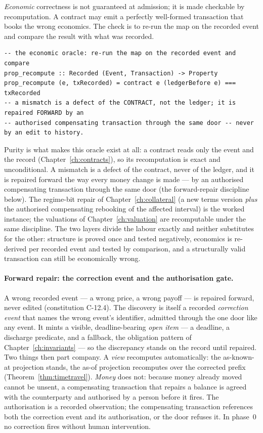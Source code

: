 \emph{Economic} correctness is not guaranteed at admission; it is made checkable by
recomputation. A contract may emit a perfectly well-formed transaction that books the wrong
economics. The check is to re-run the map on the recorded event and compare the result with
what was recorded.

\begin{lstlisting}
-- the economic oracle: re-run the map on the recorded event and compare
prop_recompute :: Recorded (Event, Transaction) -> Property
prop_recompute (e, txRecorded) = contract e (ledgerBefore e) === txRecorded
-- a mismatch is a defect of the CONTRACT, not the ledger; it is repaired FORWARD by an
-- authorised compensating transaction through the same door -- never by an edit to history.
\end{lstlisting}

Purity is what makes this oracle exist at all: a contract reads only the event and the
record (Chapter~\ref{ch:contracts}), so its recomputation is exact and unconditional. A
mismatch is a defect of the contract, never of the ledger, and it is repaired forward the way every
money change is made --- by an authorised compensating transaction through the same door
(the forward-repair discipline below). The regime-bit
repair of Chapter~\ref{ch:collateral} (a new terms version \emph{plus} the authorised compensating
rebooking of the affected interval) is the worked instance; the valuations of
Chapter~\ref{ch:valuation} are recomputable under the same discipline. The two layers
divide the labour exactly and neither substitutes for the other: structure is proved once
and tested negatively, economics is re-derived per recorded event and tested by comparison,
and a structurally valid transaction can still be economically wrong.

\paragraph{Forward repair: the correction event and the authorisation gate.}
A wrong recorded event --- a wrong price, a wrong payoff --- is repaired forward, never
edited (constitution C-12.4). The discovery is itself a recorded \emph{correction event}
that names the wrong event's identifier, admitted through the one door like any event. It
mints a visible, deadline-bearing \emph{open item} --- a deadline, a discharge predicate,
and a fallback, the obligation pattern of Chapter~\ref{ch:invariants} --- so the discrepancy
stands on the record until repaired. Two things then part company. A \emph{view} recomputes
automatically: the as-known-at projection stands, the as-of projection recomputes over the
corrected prefix (Theorem~\ref{thm:timetravel}). \emph{Money} does not: because money already
moved cannot be unsent, a compensating transaction that repairs a balance is agreed with the
counterparty and authorised by a person before it fires. The authorisation is a recorded
observation; the compensating transaction references both the correction event and its
authorisation, or the door refuses it. In phase~0 no correction fires without human
intervention.

